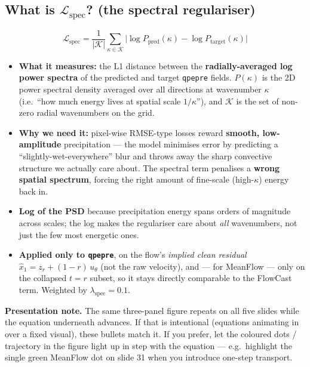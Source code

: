\documentclass[11pt]{article}
\begin{document}
\subsection*{What is $\mathcal{L}_{\text{spec}}$? (the spectral regulariser)}
\begin{equation*}
  \mathcal{L}_{\text{spec}} = \frac{1}{|\mathcal{K}|}\sum_{\kappa \in \mathcal{K}}
    \bigl|\log P_{\text{pred}}(\kappa) - \log P_{\text{target}}(\kappa)\bigr|
\end{equation*}
\begin{itemize}
  \item \textbf{What it measures:} the L1 distance between the
        \textbf{radially-averaged log power spectra} of the predicted and
        target \texttt{qpepre} fields. $P(\kappa)$ is the 2D power spectral
        density averaged over all directions at wavenumber $\kappa$
        (i.e.\ ``how much energy lives at spatial scale $1/\kappa$''), and
        $\mathcal{K}$ is the set of non-zero radial wavenumbers on the grid.
  \item \textbf{Why we need it:} pixel-wise RMSE-type losses reward
        \textbf{smooth, low-amplitude} precipitation --- the model minimises
        error by predicting a ``slightly-wet-everywhere'' blur and throws away
        the sharp convective structure we actually care about. The spectral
        term penalises a \textbf{wrong spatial spectrum}, forcing the right
        amount of fine-scale (high-$\kappa$) energy back in.
  \item \textbf{Log of the PSD} because precipitation energy spans orders of
        magnitude across scales; the log makes the regulariser care about
        \emph{all} wavenumbers, not just the few most energetic ones.
  \item \textbf{Applied only to \texttt{qpepre}}, on the flow's
        \emph{implied clean residual} $\hat{x}_1 = z_r + (1 - r)\,u_\theta$ (not
        the raw velocity), and --- for MeanFlow --- only on the collapsed
        $t = r$ subset, so it stays directly comparable to the FlowCast term.
        Weighted by $\lambda_{\text{spec}} = 0.1$.
\end{itemize}

\vspace{1em}
\begin{mdframed}[backgroundcolor=gray!8, linecolor=gray!40]
\textbf{Presentation note.} The same three-panel figure repeats on all five
slides while the equation underneath advances. If that is intentional
(equations animating in over a fixed visual), these bullets match it. If you
prefer, let the coloured dots / trajectory in the figure light up in step with
the equation --- e.g.\ highlight the single green MeanFlow dot on slide 31 when
you introduce one-step transport.
\end{mdframed}
\end{document}
